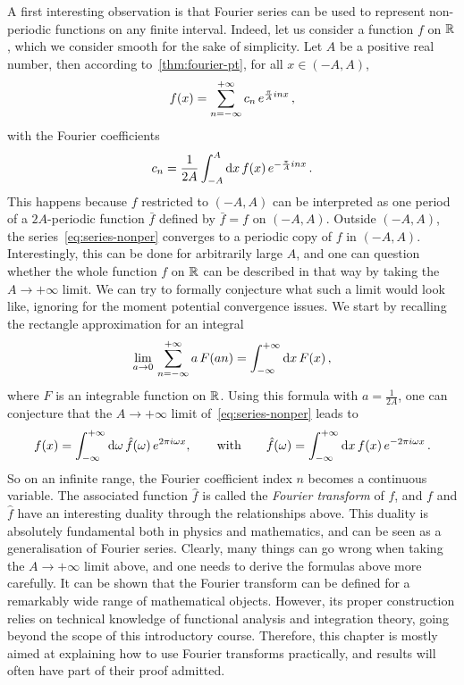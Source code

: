 A first interesting observation is that Fourier series can be used to represent
non-periodic functions on any finite interval. Indeed, let us consider a function $f$ on
$\mathbb{R}$, which we consider smooth for the sake of simplicity. Let $A$ be a positive real
number, then according to~\cref{thm:fourier-pt}, for all $x\in(-A,A)$,
\begin{equation}
  f(x)=\sum_{n=-\infty}^{+\infty}c_n\,e^{\frac{\pi}{A}inx}\,,\label{eq:series-nonper}
\end{equation}
with the Fourier coefficients
\begin{equation}
  c_n=\frac{1}{2A}\int_{-A}^{A}\mathrm{d} x\,f(x)\,e^{-\frac{\pi}{A}inx}\,.\label{eq:cn-nonper}
\end{equation}
This happens because $f$ restricted to $(-A,A)$ can be interpreted as one period of a
$2A$-periodic function $\bar{f}$ defined by $\bar{f}=f$ on $(-A,A)$. Outside $(-A,A)$, the
series~\cref{eq:series-nonper} converges to a periodic copy of $f$ in $(-A,A)$.
Interestingly, this can be done for arbitrarily large $A$, and one can question whether
the whole function $f$ on $\mathbb{R}$ can be described in that way by taking the $A\to+\infty$
limit. We can try to formally conjecture what such a limit would look like, ignoring for
the moment potential convergence issues. We start by recalling the rectangle approximation
for an integral
\begin{equation}
  \lim_{a\to0}\,\sum_{n=-\infty}^{+\infty}a\,F(an)=\int_{-\infty}^{+\infty}\mathrm{d} x\, F(x)\,,
\end{equation}
where $F$ is an integrable function on $\mathbb{R}$. Using this formula with $a=\frac{1}{2A}$, one
can conjecture that the $A\to+\infty$ limit of~\cref{eq:series-nonper} leads to
\begin{equation}
  \label{eq:ft-conjecture}
  f(x)=\int_{-\infty}^{+\infty}\mathrm{d}\omega\,\hat{f}(\omega)\,e^{2\pi i\omega x},
  \qquad\text{with}\qquad
  \hat{f}(\omega)=\int_{-\infty}^{+\infty}\mathrm{d} x\,f(x)\,e^{-2\pi i\omega x}\,.
\end{equation}
So on an infinite range, the Fourier coefficient index $n$ becomes a continuous variable.
The associated function $\hat{f}$ is called the \emph{Fourier transform} of $f$, and $f$
and $\hat{f}$ have an interesting duality through the relationships above. This duality is
absolutely fundamental both in physics and mathematics, and can be seen as a
generalisation of Fourier series. Clearly, many things can go wrong when taking the
$A\to+\infty$ limit above, and one needs to derive the formulas above more carefully. It
can be shown that the Fourier transform can be defined for a remarkably wide range of
mathematical objects. However, its proper construction relies on technical knowledge of
functional analysis and integration theory, going beyond the scope of this introductory
course. Therefore, this chapter is mostly aimed at explaining how to use Fourier
transforms practically, and results will often have part of their proof admitted.

